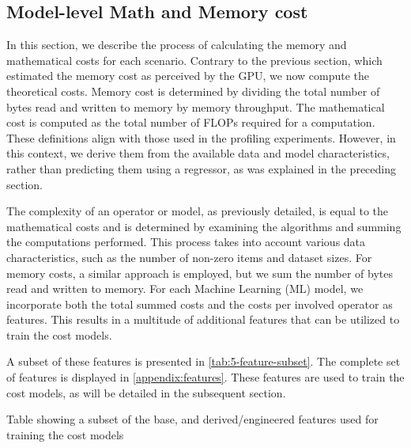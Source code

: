 \subsection{Model-level Math and Memory cost}
\label{subsec:5-model-level-cost}
In this section, we describe the process of calculating the memory and mathematical costs for each scenario. Contrary to the previous section, which estimated the memory cost as perceived by the GPU, we now compute the theoretical costs. Memory cost is determined by dividing the total number of bytes read and written to memory by memory throughput. The mathematical cost is computed as the total number of FLOPs required for a computation. These definitions align with those used in the profiling experiments. However, in this context, we derive them from the available data and model characteristics, rather than predicting them using a regressor, as was explained in the preceding section.

The complexity of an operator or model, as previously detailed, is equal to the mathematical costs and is determined by examining the algorithms and summing the computations performed. This process takes into account various data characteristics, such as the number of non-zero items and dataset sizes. For memory costs, a similar approach is employed, but we sum the number of bytes read and written to memory. For each Machine Learning (ML) model, we incorporate both the total summed costs and the costs per involved operator as features. This results in a multitude of additional features that can be utilized to train the cost models.

A subset of these features is presented in \autoref{tab:5-feature-subset}. The complete set of features is displayed in \autoref{appendix:features}. These features are used to train the cost models, as will be detailed in the subsequent section.

\begin{table}[ht]
  
  \caption[Feature table]{Table showing a subset of the base, and derived/engineered features used for training the cost models}
  \label{tab:5-feature-subset}
\end{table}

